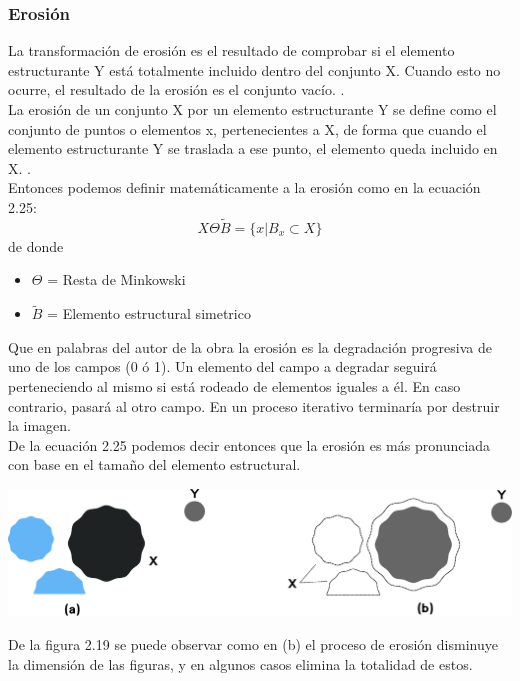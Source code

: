 \subsubsection{Erosión}
La transformación de erosión es el resultado de comprobar si el elemento estructurante
Y está totalmente incluido dentro del conjunto X. Cuando esto no ocurre, el resultado de la
erosión es el conjunto vacío. \cite{10045_10053}.\\
La erosión de un conjunto X por un elemento estructurante Y se define como el conjunto
de puntos o elementos x, pertenecientes a X, de forma que cuando el elemento estructurante Y se
traslada a ese punto, el elemento queda incluido en X. \cite{10045_10053}.\\
Entonces podemos definir matemáticamente a la erosión como en la ecuación 2.25:
\begin{equation}
	X \Theta \tilde{B} = \{ x|B_x \subset X \}
\end{equation}
de donde
\begin{itemize}
	\item $\Theta$ = Resta de Minkowski
	\item $\tilde{B}$ = Elemento estructural simetrico
\end{itemize}
Que en palabras del autor de la obra \cite{Book:Arturo2011} la erosión es la degradación progresiva de uno de los campos (0 ó 1). Un elemento del
campo a degradar seguirá perteneciendo al mismo si está rodeado de elementos iguales
a él. En caso contrario, pasará al otro campo. En un proceso iterativo terminaría por
destruir la imagen.\\
De la ecuación 2.25 podemos decir entonces que la erosión es más pronunciada con base en el tamaño del elemento estructural.
\begin{center}
	\includegraphics[width=0.9 \textwidth]{Contenido/Cuerpo/Capitulo2/Fig14.eps}
	\label{fig:MarcoTeorico:Fig23}
\end{center}
De la figura 2.19 se puede observar como en (b) el proceso de erosión disminuye la dimensión de las figuras, y en algunos casos elimina la totalidad de estos.

